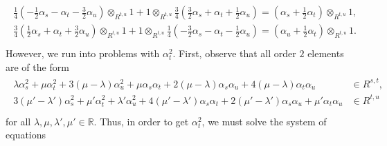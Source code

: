 \begin{example}
\begin{align*}
\begin{split}
\frac{1}{4}\left(-\frac{1}{2}\alpha_s - \alpha_t - \frac{3}{2}\alpha_u\right) \otimes_{R^{t,u}} 1 + 1 \otimes_{R^{t,u}} \frac{3}{4}\left(\frac{3}{2}\alpha_s + \alpha_t + \frac{1}{2}\alpha_u\right) = \left(\alpha_s + \frac{1}{2}\alpha_t\right) \otimes_{R^{t,u}} 1,\\
\frac{3}{4}\left(\frac{1}{2}\alpha_s + \alpha_t + \frac{3}{2}\alpha_u\right) \otimes_{R^{t,u}} 1 + 1 \otimes_{R^{t,u}} \frac{1}{4}\left(-\frac{3}{2}\alpha_s - \alpha_t - \frac{1}{2}\alpha_u\right) = \left(\alpha_u + \frac{1}{2}\alpha_t\right) \otimes_{R^{t,u}} 1.\\
\end{split}
\end{align*}
\noindent However, we run into problems with $\alpha_t^2$. First, observe that all order $2$ elements are of the form
\begin{align*}
\begin{split}
\lambda\alpha_s^2 + \mu\alpha_t^2 + 3(\mu - \lambda)\alpha_u^2 + \mu\alpha_s\alpha_t + 2(\mu - \lambda)\alpha_s\alpha_u + 4(\mu - \lambda)\alpha_t\alpha_u &\in R^{s,t},\\
3(\mu' - \lambda')\alpha_s^2 + \mu'\alpha_t^2 + \lambda'\alpha_u^2 + 4(\mu' - \lambda')\alpha_s\alpha_t + 2(\mu' - \lambda')\alpha_s\alpha_u + \mu'\alpha_t\alpha_u &\in R^{t,u}\\
\end{split}
\end{align*}
\noindent for all $\lambda, \mu, \lambda', \mu' \in \mathbb{R}$. Thus, in order to get $\alpha_t^2$, we must solve the system of equations
\begin{align*}

\end{align*}
\end{example}

